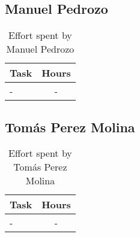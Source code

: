 \subsection{Manuel Pedrozo}

\begin{table}[H]
    \centering
    \begin{tabular}{|p{7cm}|c|}
    \hline
    \textbf{Task} & \textbf{Hours} \\ \hline
    - & - \\ \hline
    \end{tabular}
    \caption{\label{tbl:manuel-effort} Effort spent by Manuel Pedrozo}
    \end{table}

\subsection{Tomás Perez Molina}
\begin{table}[H]
    \centering
    \begin{tabular}{|p{7cm}|c|}
    \hline
    \textbf{Task} & \textbf{Hours} \\ \hline
    - & - \\ \hline
    \end{tabular}
    \caption{\label{tbl:tomas-effort} Effort spent by Tomás Perez Molina}
    \end{table}
